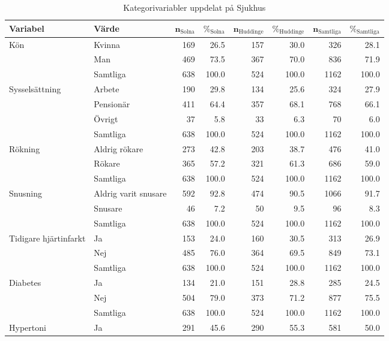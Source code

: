 \begin{table}[htbp]
\centering
\caption{Kategorivariabler uppdelat på Sjukhus} 
\label{tab:sh2}
{\footnotesize
\begin{tabular}{ll|rr|rr|rr}
 \textbf{Variabel} & \textbf{Värde} & $\mathbf{n_{\mathrm{Solna}}}$ & $\mathbf{\%_{\mathrm{Solna}}}$ & $\mathbf{n_{\mathrm{Huddinge}}}$ & $\mathbf{\%_{\mathrm{Huddinge}}}$ & $\mathbf{n_{\mathrm{Samtliga}}}$ & $\mathbf{\%_{\mathrm{Samtliga}}}$ \\ 
  \hline
Kön & Kvinna & 169 & 26.5 & 157 & 30.0 & 326 & 28.1 \\ 
   & Man & 469 & 73.5 & 367 & 70.0 & 836 & 71.9 \\ 
   \hline
 & Samtliga & 638 & 100.0 & 524 & 100.0 & 1162 & 100.0 \\ 
   \hline
\hline
Sysselsättning & Arbete & 190 & 29.8 & 134 & 25.6 & 324 & 27.9 \\ 
   & Pensionär & 411 & 64.4 & 357 & 68.1 & 768 & 66.1 \\ 
   & Övrigt & 37 & 5.8 & 33 & 6.3 & 70 & 6.0 \\ 
   \hline
 & Samtliga & 638 & 100.0 & 524 & 100.0 & 1162 & 100.0 \\ 
   \hline
\hline
Rökning & Aldrig rökare & 273 & 42.8 & 203 & 38.7 & 476 & 41.0 \\ 
   & Rökare & 365 & 57.2 & 321 & 61.3 & 686 & 59.0 \\ 
   \hline
 & Samtliga & 638 & 100.0 & 524 & 100.0 & 1162 & 100.0 \\ 
   \hline
\hline
Snusning & Aldrig varit snusare & 592 & 92.8 & 474 & 90.5 & 1066 & 91.7 \\ 
   & Snusare & 46 & 7.2 & 50 & 9.5 & 96 & 8.3 \\ 
   \hline
 & Samtliga & 638 & 100.0 & 524 & 100.0 & 1162 & 100.0 \\ 
   \hline
\hline
Tidigare hjärtinfarkt & Ja & 153 & 24.0 & 160 & 30.5 & 313 & 26.9 \\ 
   & Nej & 485 & 76.0 & 364 & 69.5 & 849 & 73.1 \\ 
   \hline
 & Samtliga & 638 & 100.0 & 524 & 100.0 & 1162 & 100.0 \\ 
   \hline
\hline
Diabetes & Ja & 134 & 21.0 & 151 & 28.8 & 285 & 24.5 \\ 
   & Nej & 504 & 79.0 & 373 & 71.2 & 877 & 75.5 \\ 
   \hline
 & Samtliga & 638 & 100.0 & 524 & 100.0 & 1162 & 100.0 \\ 
   \hline
\hline
Hypertoni & Ja & 291 & 45.6 & 290 & 55.3 & 581 & 50.0 \\ 

\end{tabular}}
\end{table}
